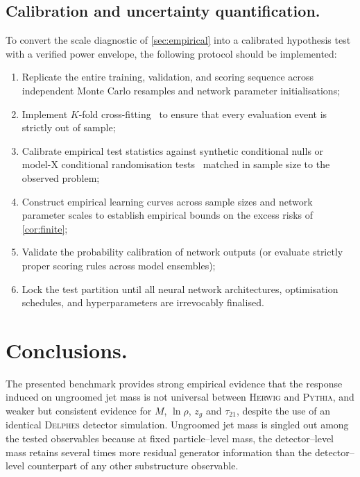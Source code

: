 \documentclass[12pt]{article}
\newcommand{\1}{\mathbbm{1}}
\renewcommand{\[}{\begin{equation}}
\renewcommand{\]}{\end{equation}}
\begin{document}
    \subsection{Calibration and uncertainty quantification.}

    To convert the scale diagnostic of \cref{sec:empirical} into a calibrated hypothesis test with a verified power envelope, the following protocol should be implemented:
    \begin{enumerate}
        \item Replicate the entire training, validation, and scoring sequence across independent Monte Carlo resamples and network parameter initialisations;
        \item Implement \(K\)-fold cross-fitting~\cite{Chernozhukov:2018} to ensure that every evaluation event is strictly out of sample;
        \item Calibrate empirical test statistics against synthetic conditional nulls or model-X conditional randomisation tests~\cite{Candes:2018} matched in sample size to the observed problem;
        \item Construct empirical learning curves across sample sizes and network parameter scales to establish empirical bounds on the excess risks of \cref{cor:finite};
        \item Validate the probability calibration of network outputs (or evaluate strictly proper scoring rules across model ensembles);
        \item Lock the test partition until all neural network architectures, optimisation schedules, and hyperparameters are irrevocably finalised.
    \end{enumerate}
    
\section{Conclusions.}
\label{sec:conclusions}

    The presented benchmark provides strong empirical evidence that the response induced on ungroomed jet mass is not universal between \textsc{Herwig} and \textsc{Pythia}, and weaker but consistent evidence for \(M\), \(\ln\rho\), \(z_g\) and \(\tau_{21}\), despite the use of an identical \textsc{Delphes} detector simulation.
    Ungroomed jet mass is singled out among the tested observables because at fixed particle--level mass, the detector--level mass retains several times more residual generator information than the detector--level counterpart of any other substructure observable.
\end{document}
